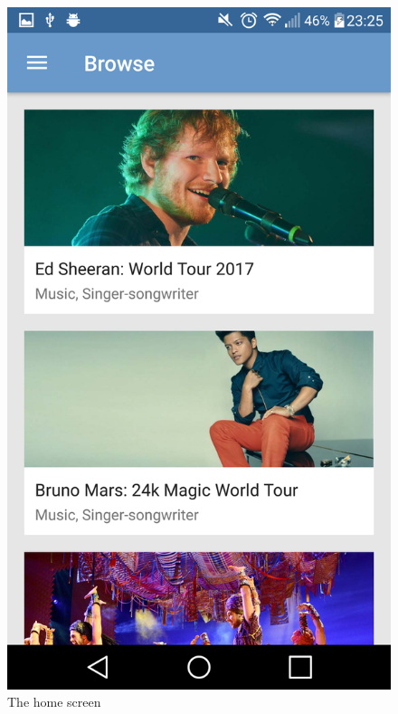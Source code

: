 \documentclass[12pt,a4paper]{bhamdissertation}
\begin{document}
\begin{figure}[!htbp]
  \centering
  \hspace{0.05\textwidth}
  \begin{minipage}[b]{0.4\textwidth}
    \includegraphics[width=\textwidth]{img/app_browse.png}
    \caption{The home screen}
    \label{img:app_browse}
  \end{minipage}
  \hfill
  \begin{minipage}[b]{0.4\textwidth}

\end{minipage}
\end{figure}
\end{document}
